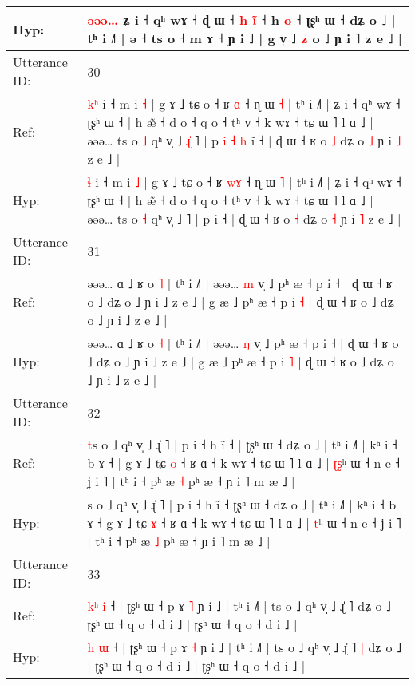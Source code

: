 \documentclass[10pt]{article}
\DeclareRobustCommand{\hl}[1]{{\textcolor{red}{#1}}}
\begin{document}
\begin{longtable}{ll}
 \\
Hyp: & \hl{ə}\hl{ə}\hl{ə}\hl{…} ʑ i ˧ qʰ wɤ ˧\hl{}\hl{} ɖ ɯ ˧ \hl{h} \hl{i}\hl{̃} ˧ h \hl{}\hl{o} ˧ ʈʂʰ ɯ ˧ dʑ o ˩ | tʰ i ˩˥ | ə ˧ ts o ˧ m ɤ ˧ ɲ i ˩ | g v̩ ˩ \hl{}\hl{z} o ˩ ɲ i ˥ z e ˩ |
 \\
\midrule
Utterance ID: & 30 \\
Ref: & \hl{k}\hl{ʰ} i ˧ m i \hl{˧} | g ɤ ˩ tɕ o ˧ ʁ \hl{}\hl{ɑ} ˧ ɳ ɯ \hl{˧} | tʰ i ˩˥ | ʑ i ˧ qʰ wɤ ˧ ʈʂʰ ɯ ˧ | h æ̃ ˧ d o ˧ q o ˧ tʰ v̩ ˧ k wɤ ˧ tɕ ɯ ˥ l ɑ ˩ | əəə… ts o \hl{˩} qʰ v̩ ˩\hl{ }\hl{ɻ}\hl{̍} ˥ | p\hl{ }\hl{i}\hl{ }\hl{˧}\hl{ }\hl{h} i\hl{̃} ˧ | ɖ ɯ ˧ ʁ o \hl{˩} dʑ o \hl{˩} ɲ i \hl{˩} z e ˩ |
 \\
Hyp: & \hl{}\hl{ɬ} i ˧ m i \hl{˩} | g ɤ ˩ tɕ o ˧ ʁ \hl{w}\hl{ɤ} ˧ ɳ ɯ \hl{˥} | tʰ i ˩˥ | ʑ i ˧ qʰ wɤ ˧ ʈʂʰ ɯ ˧ | h æ̃ ˧ d o ˧ q o ˧ tʰ v̩ ˧ k wɤ ˧ tɕ ɯ ˥ l ɑ ˩ | əəə… ts o \hl{˧} qʰ v̩ ˩\hl{}\hl{}\hl{} ˥ | p\hl{}\hl{}\hl{}\hl{}\hl{}\hl{} i\hl{} ˧ | ɖ ɯ ˧ ʁ o \hl{˧} dʑ o \hl{˧} ɲ i \hl{˥} z e ˩ |
 \\
\midrule
Utterance ID: & 31 \\
Ref: & əəə… ɑ ˩ ʁ o \hl{˥} | tʰ i ˩˥ | əəə… \hl{m} v̩ ˩ pʰ æ ˧ p i ˧ | ɖ ɯ ˧ ʁ o ˩ dʑ o ˩ ɲ i ˩ z e ˩ | g æ ˩ pʰ æ ˧ p i \hl{˧} | ɖ ɯ ˧ ʁ o ˩ dʑ o ˩ ɲ i ˩ z e ˩ |
 \\
Hyp: & əəə… ɑ ˩ ʁ o \hl{˧} | tʰ i ˩˥ | əəə… \hl{ŋ} v̩ ˩ pʰ æ ˧ p i ˧ | ɖ ɯ ˧ ʁ o ˩ dʑ o ˩ ɲ i ˩ z e ˩ | g æ ˩ pʰ æ ˧ p i \hl{˥} | ɖ ɯ ˧ ʁ o ˩ dʑ o ˩ ɲ i ˩ z e ˩ |
 \\
\midrule
Utterance ID: & 32 \\
Ref: & \hl{t}s o ˩ qʰ v̩ ˩ ɻ̍ ˥ | p i ˧ h ĩ ˧\hl{ }\hl{|} ʈʂʰ ɯ ˧ dʑ o ˩ | tʰ i ˩˥ | kʰ i ˧ b ɤ ˧\hl{ }\hl{|} g ɤ ˩ tɕ \hl{o} ˧ ʁ ɑ ˧ k wɤ ˧ tɕ ɯ ˥ l ɑ ˩ | \hl{ʈ}\hl{ʂ}ʰ ɯ ˧ n e ˧ ʝ i ˥ | tʰ i ˧ pʰ æ \hl{˧} pʰ æ ˧ ɲ i ˥ m æ ˩ |
 \\
Hyp: & \hl{}s o ˩ qʰ v̩ ˩ ɻ̍ ˥ | p i ˧ h ĩ ˧\hl{}\hl{} ʈʂʰ ɯ ˧ dʑ o ˩ | tʰ i ˩˥ | kʰ i ˧ b ɤ ˧\hl{}\hl{} g ɤ ˩ tɕ \hl{ɤ} ˧ ʁ ɑ ˧ k wɤ ˧ tɕ ɯ ˥ l ɑ ˩ | \hl{}\hl{t}ʰ ɯ ˧ n e ˧ ʝ i ˥ | tʰ i ˧ pʰ æ \hl{˩} pʰ æ ˧ ɲ i ˥ m æ ˩ |
 \\
\midrule
Utterance ID: & 33 \\
Ref: & \hl{k}\hl{ʰ} \hl{i} ˧ | ʈʂʰ ɯ ˧ p ɤ \hl{˥} ɲ i ˩ | tʰ i ˩˥ | ts o ˩ qʰ v̩ ˩ ɻ̍ ˥\hl{}\hl{} dʑ o ˩ | ʈʂʰ ɯ ˧ q o ˧ d i ˩ | ʈʂʰ ɯ ˧ q o ˧ d i ˩ |
 \\
Hyp: & \hl{}\hl{h} \hl{ɯ} ˧ | ʈʂʰ ɯ ˧ p ɤ \hl{˧} ɲ i ˩ | tʰ i ˩˥ | ts o ˩ qʰ v̩ ˩ ɻ̍ ˥\hl{ }\hl{|} dʑ o ˩ | ʈʂʰ ɯ ˧ q o ˧ d i ˩ | ʈʂʰ ɯ ˧ q o ˧ d i ˩ |
 \\
\midrule

\end{longtable}
\end{document}
